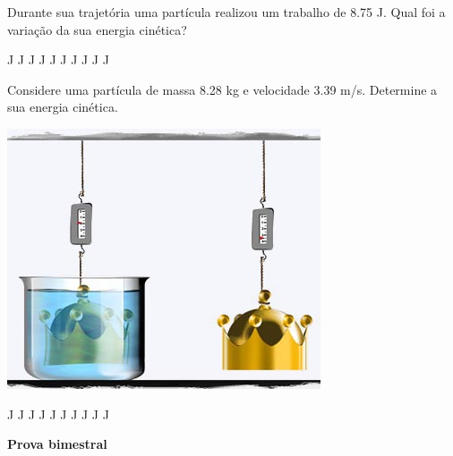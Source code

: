 \documentclass[12pt, addpoints]{exam}
\begin{document}
\begin{questions}
\begin{multicols*}{2}
\question[33] Durante sua trajetória uma partícula realizou um trabalho de    8.75 J. Qual foi a variação da sua energia cinética?

\begin{oneparchoices}
 J J J J J J J J J J\end{oneparchoices}
\question[23] Considere uma partícula de massa    8.28 kg e velocidade    3.39 m/s. Determine a sua energia cinética.

\begin{center}
\begin{minipage}[c]{0.75\linewidth}
\includegraphics[width=\textwidth]{MWE001.jpg}
\end{minipage}

\end{center}
\begin{oneparchoices}
 J J J J J J J J J J\end{oneparchoices}
\end{multicols*}
\end{questions}
\newpage
\begin{minipage}[l]{0.5\linewidth}
    \begin{flushleft}
        {\bf \Large Prova bimestral}
    \end{flushleft}
\end{minipage}
\end{document}
